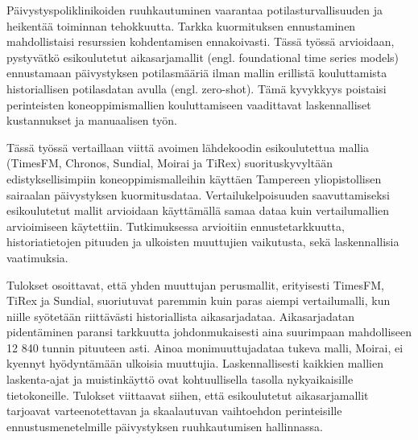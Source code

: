 Päivystyspoliklinikoiden ruuhkautuminen vaarantaa potilasturvallisuuden ja heikentää toiminnan tehokkuutta. Tarkka kuormituksen ennustaminen mahdollistaisi resurssien kohdentamisen ennakoivasti. Tässä työssä arvioidaan, pystyvätkö esikoulutetut aikasarjamallit (engl. foundational time series models) ennustamaan päivystyksen potilasmääriä ilman mallin erillistä kouluttamista historiallisen potilasdatan avulla (engl. zero-shot). Tämä kyvykkyys poistaisi perinteisten koneoppimismallien kouluttamiseen vaadittavat laskennalliset kustannukset ja manuaalisen työn.

Tässä työssä vertaillaan viittä avoimen lähdekoodin esikoulutettua mallia (TimesFM, Chronos, Sundial, Moirai ja TiRex) suorituskyvyltään edistyksellisimpiin koneoppimismalleihin käyttäen Tampereen yliopistollisen sairaalan päivystyksen kuormitusdataa. Vertailukelpoisuuden saavuttamiseksi esikoulutetut mallit arvioidaan käyttämällä samaa dataa kuin vertailumallien arvioimiseen käytettiin. Tutkimuksessa arvioitiin ennustetarkkuutta, historiatietojen pituuden ja ulkoisten muuttujien vaikutusta, sekä laskennallisia vaatimuksia.

Tulokset osoittavat, että yhden muuttujan perusmallit, erityisesti TimesFM, TiRex ja Sundial, suoriutuvat paremmin kuin paras aiempi vertailumalli, kun niille syötetään riittävästi historiallista aikasarjadataa. Aikasarjadatan pidentäminen paransi tarkkuutta johdonmukaisesti aina suurimpaan mahdolliseen 12 840 tunnin pituuteen asti. Ainoa monimuuttujadataa tukeva malli, Moirai, ei kyennyt hyödyntämään ulkoisia muuttujia. Laskennallisesti kaikkien mallien laskenta-ajat ja muistinkäyttö ovat kohtuullisella tasolla nykyaikaisille tietokoneille. Tulokset viittaavat siihen, että esikoulutetut aikasarjamallit tarjoavat varteenotettavan ja skaalautuvan vaihtoehdon perinteisille ennustusmenetelmille päivystyksen ruuhkautumisen hallinnassa.
